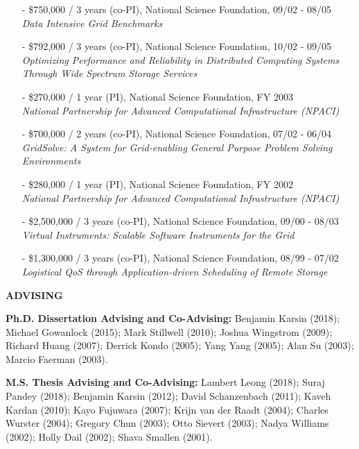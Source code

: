 \documentclass[times,11pt]{letter}
\begin{document}
\begin{itemize}
\item[-] \$750,000 / 3 years (co-PI), National Science Foundation, 09/02 - 08/05~\\
	{\it Data Intensive Grid Benchmarks}

\item[-] \$792,000 / 3 years (co-PI), National Science Foundation, 10/02 - 09/05~\\  
      {\it Optimizing Performance and Reliability in Distributed Computing Systems 
       Through Wide Spectrum Storage Services}

\item[-] \$270,000 / 1 year (PI), National Science Foundation, FY 2003~\\
      \emph{National Partnership for Advanced Computational Infrastructure (NPACI)}


\item[-] \$700,000 / 2 years (co-PI), National Science Foundation, 07/02 - 06/04~\\
      {\it GridSolve:  A System for Grid-enabling General Purpose Problem Solving Environments}

\item[-] \$280,000 / 1 year (PI), National Science Foundation, FY 2002~\\
      \emph{National Partnership for Advanced Computational Infrastructure (NPACI)}

\item[-] \$2,500,000 / 3 years (co-PI), National Science Foundation, 09/00 - 08/03~\\
{\it Virtual Instruments: Scalable Software Instruments for the Grid}

\item[-] \$1,300,000 / 3 years (co-PI), National Science Foundation, 08/99 - 07/02~\\
{\it Logistical QoS through Application-driven Scheduling of Remote Storage}

\end{itemize}

\noindent
{\large{\bf ADVISING}}


\noindent
{\bf Ph.D. Dissertation Advising and Co-Advising:}
 Benjamin Karsin (2018); 
 Michael Gowanlock (2015);
 Mark Stillwell (2010); 
 Joshua Wingstrom (2009);
 Richard Huang (2007); 
 Derrick Kondo (2005);
 Yang Yang (2005);
 Alan Su (2003);
 Marcio Faerman (2003).

\noindent
{\bf M.S. Thesis Advising and Co-Advising:}
 Lambert Leong (2018);
 Suraj Pandey (2018);
 Benjamin Karsin (2012);
 David Schanzenbach (2011);
 Kaveh Kardan (2010);
 Kayo Fujuwara (2007);
 Krijn van der Raadt (2004);
 Charles Wurster (2004);
 Gregory Chun (2003);
 Otto Sievert (2003);
 Nadya Williams (2002);
 Holly Dail (2002);
 Shava Smallen (2001).
\end{document}
